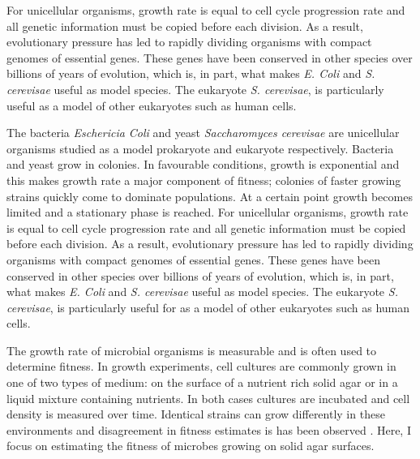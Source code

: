 For unicellular organisms, growth rate is equal to cell cycle
progression rate and all genetic information must be copied before
each division. As a result, evolutionary pressure has led to rapidly
dividing organisms with compact genomes of essential genes. These
genes have been conserved in other species over billions of years of
evolution, which is, in part, what makes \textit{E. Coli} and
\textit{S.  cerevisae} useful as model species. The eukaryote
\textit{S. cerevisae}, is particularly useful as a model of other
eukaryotes such as human cells.


The bacteria \textit{Eschericia Coli} and yeast \textit{Saccharomyces
  cerevisae} are unicellular organisms studied as a model prokaryote
and eukaryote respectively. Bacteria and yeast grow in colonies. In
favourable conditions, growth is exponential and this makes growth
rate a major component of fitness; colonies of faster growing strains
quickly come to dominate populations. At a certain point growth
becomes limited and a stationary phase is reached. For unicellular
organisms, growth rate is equal to cell cycle progression rate and all
genetic information must be copied before each division. As a result,
evolutionary pressure has led to rapidly dividing organisms with
compact genomes of essential genes. These genes have been conserved in
other species over billions of years of evolution, which is, in part,
what makes \textit{E. Coli} and \textit{S.  cerevisae} useful as model
species. The eukaryote \textit{S. cerevisae}, is particularly useful
for as a model of other eukaryotes such as human cells.

The growth rate of microbial organisms is measurable and is often used
to determine fitness. In growth experiments, cell cultures are
commonly grown in one of two types of medium: on the surface of a
nutrient rich solid agar or in a liquid mixture containing
nutrients. In both cases cultures are incubated and cell density is
measured over time. Identical strains can grow differently in these
environments and disagreement in fitness estimates is has been
observed \citet{Baryshnikova2010}. Here, I focus on estimating the
fitness of microbes growing on solid agar surfaces.




